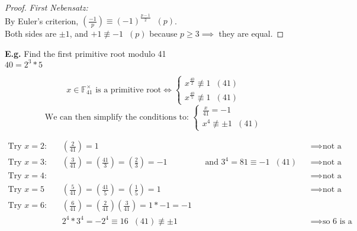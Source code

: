 \documentclass[11pt]{article}
\begin{document}
\begin{proof}
	\textit{First Nebensatz:} \\
	By Euler's criterion, $(\frac{-1}{p}) \equiv (-1)^{\frac{p-1}{2}} \hspace{7pt}(p)$. \\ 
	Both sides are $\pm 1$, and $+1 \not \equiv -1 \hspace{7pt} (p) $ because $p\geq 3 \implies$ they are equal.
\end{proof}

\textbf{E.g.} Find the first primitive root modulo 41\\
$40 = 2^3  * 5 $ 


\begin{equation*}
	x\in \mathbb{F}^{\times}_{41}  \text{ is a primitive root} \iff 
	\begin{cases}
		x^{\frac{40}{2}} \not \equiv 1 \hspace{7pt}(41)\\
		x^{\frac{40}{5}} \not \equiv 1 \hspace{7pt}(41) 
	\end{cases}
\end{equation*}
\begin{equation*}
	\text{We can then simplify the conditions to:    }
	\begin{cases}
		\frac{x}{41} = -1\\
		x^4 \not \equiv \pm 1 \hspace{7pt} (41)
	\end{cases}
\end{equation*}

\begin{align*}
	\text{Try } x=2: \hspace{10pt} &(\frac{2}{41}) = 1  && && \implies \text{not a primitive root} \\
	\text{Try } x=3:  \hspace{10pt}&  (\frac{3}{41}) = (\frac{41}{3}) = (\frac{2}{3}) = -1 && \text{and } 3^4 = 81 \equiv -1\hspace{7pt} (41) &&\implies \text{not a primitive root}\\
	\text{Try } x=4: \hspace{10pt}&&&&& \implies \text{not a primitive root}\\
	\text{Try } x=5 \hspace{16pt}& (\frac{5}{41}) = (\frac{41}{5}) = (\frac{1}{5}) = 1 &&&& \implies \text{not a primitive root}\\
	\text{Try } x =6:  \hspace{10pt} &(\frac{6}{41}) = (\frac{2}{41}) (\frac{3}{41})= 1 * -1 =-1 \\
	&2^4 * 3^4 = -2^4 \equiv 16 \hspace{7pt} (41) \not \equiv \pm 1  &&&& \implies \text{so 6 is a primitive root} 
\end{align*}
\\[1em]
\end{document}
